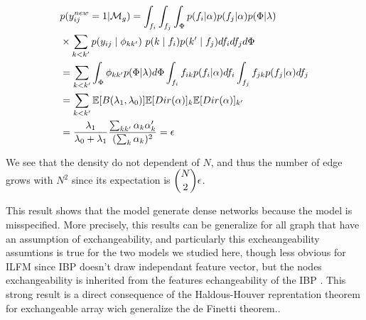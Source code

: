 
\begin{align}
&p(y_{ij}^{new}=1| \mathcal{M}_g) = \int_{f_i} \int_{f_j} \int_{\Phi} p(f_i| \alpha ) p(f_j| \alpha)p(\Phi| \lambda) \\
&\times \sum_{k<k'} p(y_{ij} \mid \phi_{kk'})\ p(k\mid f_i)p(k'\mid f_j)df_i df_j d\Phi \\
&=  \sum_{k<k'} \int_{\Phi} \phi_{kk'} p(\Phi| \lambda) d\Phi \int_{f_i} f_{ik} p(f_i| \alpha )df_i \int_{f_j} f_{jk}  p(f_j| \alpha ) df_j \\
&= \sum_{k<k'} \mathbb{E}[B(\lambda_1, \lambda_0)] \mathbb{E}[Dir(\mathbf{\alpha} )]_k \mathbb{E}[Dir(\mathbf{\alpha})]_{k'} \\
&= \frac{\lambda_1}{\lambda_0+\lambda_1}\frac{\sum_{kk'} \alpha_k\alpha_k'}{(\sum_k \alpha_k)^2} = \epsilon
\end{align}


We see that the density do not dependent of $N$, and thus the number of edge grows with $N^2$ since its expectation is  $\dbinom{N}{2} \epsilon$.

This result shows that the model generate dense networks because the model is misspecified. More precisely, this results can be generalize for all graph that have an assumption of exchangeability, and particularly this excheangeability assumtions is true for the two models we studied here, though less obvious for ILFM since IBP doesn't draw independant feature vector, but the nodes exchangeability is inherited from the features echangeability of the IBP \cite{orbanz2015bayesian}. This strong result is a direct consequence of the Haldous-Houver reprentation theorem for exchangeable array wich generalize the de Finetti theorem.\cite{orbanz2015bayesian}. 
